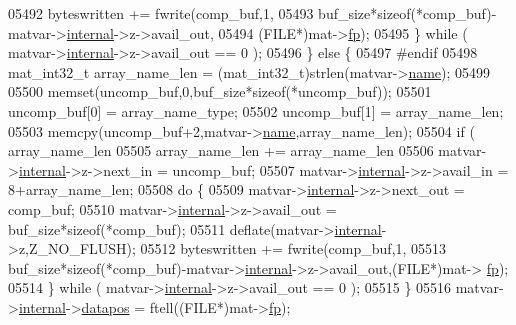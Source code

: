 \begin{DoxyCode}
{{{{{{{{{{{{{{{{{{{{{{{{{{{{{{{{05492                 byteswritten += fwrite(comp\_buf,1,
05493                     buf\_size*\textcolor{keyword}{sizeof}(*comp\_buf)-matvar->\hyperlink{group___m_a_t_a6e97e3ed9f40c49322c18561c2a94e92}{internal}->z->avail\_out,
05494                     (FILE*)mat->\hyperlink{struct__mat__t_a85f562e407ca9ad4d2a6e14f839432b7}{fp});
05495             \} \textcolor{keywordflow}{while} ( matvar->\hyperlink{group___m_a_t_a6e97e3ed9f40c49322c18561c2a94e92}{internal}->z->avail\_out == 0 );
05496         \} \textcolor{keywordflow}{else} \{
05497 \textcolor{preprocessor}{#endif}
05498             mat\_int32\_t array\_name\_len = (mat\_int32\_t)strlen(matvar->\hyperlink{group___m_a_t_a5d4b55b041e3b4fb50c04337f05ad909}{name});
05499 
05500             memset(uncomp\_buf,0,buf\_size*\textcolor{keyword}{sizeof}(*uncomp\_buf));
05501             uncomp\_buf[0] = array\_name\_type;
05502             uncomp\_buf[1] = array\_name\_len;
05503             memcpy(uncomp\_buf+2,matvar->\hyperlink{group___m_a_t_a5d4b55b041e3b4fb50c04337f05ad909}{name},array\_name\_len);
05504             \textcolor{keywordflow}{if} ( array\_name\_len %
05505                 array\_name\_len += array\_name\_len %
05506             matvar->\hyperlink{group___m_a_t_a6e97e3ed9f40c49322c18561c2a94e92}{internal}->z->next\_in   = uncomp\_buf;
05507             matvar->\hyperlink{group___m_a_t_a6e97e3ed9f40c49322c18561c2a94e92}{internal}->z->avail\_in  = 8+array\_name\_len;
05508             \textcolor{keywordflow}{do} \{
05509                 matvar->\hyperlink{group___m_a_t_a6e97e3ed9f40c49322c18561c2a94e92}{internal}->z->next\_out  = comp\_buf;
05510                 matvar->\hyperlink{group___m_a_t_a6e97e3ed9f40c49322c18561c2a94e92}{internal}->z->avail\_out = buf\_size*\textcolor{keyword}{sizeof}(*comp\_buf);
05511                 deflate(matvar->\hyperlink{group___m_a_t_a6e97e3ed9f40c49322c18561c2a94e92}{internal}->z,Z\_NO\_FLUSH);
05512                 byteswritten += fwrite(comp\_buf,1,
05513                     buf\_size*\textcolor{keyword}{sizeof}(*comp\_buf)-matvar->\hyperlink{group___m_a_t_a6e97e3ed9f40c49322c18561c2a94e92}{internal}->z->avail\_out,(FILE*)mat->
      \hyperlink{struct__mat__t_a85f562e407ca9ad4d2a6e14f839432b7}{fp});
05514             \} \textcolor{keywordflow}{while} ( matvar->\hyperlink{group___m_a_t_a6e97e3ed9f40c49322c18561c2a94e92}{internal}->z->avail\_out == 0 );
05515         \}
05516         matvar->\hyperlink{group___m_a_t_a6e97e3ed9f40c49322c18561c2a94e92}{internal}->\hyperlink{structmatvar__internal_afd3bfaab126a160bd6855563e1ea0a7e}{datapos} = ftell((FILE*)mat->\hyperlink{struct__mat__t_a85f562e407ca9ad4d2a6e14f839432b7}{fp});
}}}}}}}}}}}}}}}}}}}}}}}}}}}}}}}}
\end{DoxyCode}

